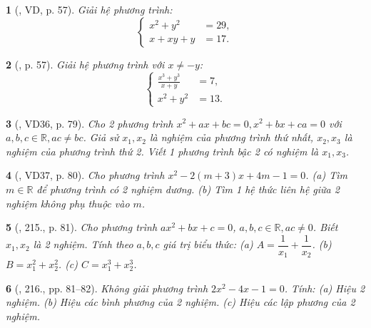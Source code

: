 \documentclass{article}
\newtheorem{baitoan}{}
\begin{document}
\begin{baitoan}[\cite{Binh_boi_duong_Toan_9_tap_2}, VD, p. 57]
	Giải hệ phương trình:
	\begin{equation*}
		\left\{\begin{split}
			x^2 + y^2 &= 29,\\
			x + xy + y &= 17.
		\end{split}\right.
	\end{equation*}
\end{baitoan}

\begin{baitoan}[\cite{Binh_boi_duong_Toan_9_tap_2}, p. 57]
	Giải hệ phương trình với $x\ne-y$:
	\begin{equation*}
		\left\{\begin{split}
			\frac{x^3 + y^3}{x + y} &= 7,\\
			x^2 + y^2 &= 13.
		\end{split}\right.
	\end{equation*}
\end{baitoan}

\begin{baitoan}[\cite{Tuyen_Toan_9_old}, VD36, p. 79]
	Cho 2 phương trình $x^2 + ax + bc = 0,x^2 + bx + ca = 0$ với $a,b,c\in\mathbb{R},ac\ne bc$. Giả sử $x_1,x_2$ là nghiệm của phương trình thứ nhất, $x_2,x_3$ là nghiệm của phương trình thứ 2. Viết 1 phương trình bậc 2 có nghiệm là $x_1,x_3$.
\end{baitoan}

\begin{baitoan}[\cite{Tuyen_Toan_9_old}, VD37, p. 80]
	Cho phương trình $x^2 - 2(m + 3)x + 4m - 1 = 0$. (a) Tìm $m\in\mathbb{R}$ để phương trình có 2 nghiệm dương. (b) Tìm 1 hệ thức liên hệ giữa 2 nghiệm không phụ thuộc vào $m$.
\end{baitoan}

\begin{baitoan}[\cite{Tuyen_Toan_9_old}, 215., p. 81]
	Cho phương trình $ax^2 + bx + c = 0$, $a,b,c\in\mathbb{R},ac\ne0$. Biết $x_1,x_2$ là 2 nghiệm. Tính theo $a,b,c$ giá trị biểu thức: (a) $A = \dfrac{1}{x_1} + \dfrac{1}{x_2}$. (b) $B = x_1^2 + x_2^2$. (c) $C = x_1^3 + x_2^3$.
\end{baitoan}

\begin{baitoan}[\cite{Tuyen_Toan_9_old}, 216., pp. 81--82]
	Không giải phương trình $2x^2 - 4x - 1 = 0$. Tính: (a) Hiệu 2 nghiệm. (b) Hiệu các bình phương của 2 nghiệm. (c) Hiệu các lập phương của 2 nghiệm.
\end{baitoan}
\end{document}

